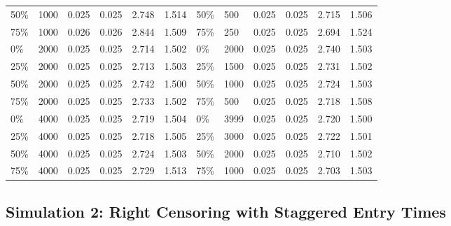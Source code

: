 \begin{table}[htbp]
\begin{tabular}{@{}C{1.8cm}lllll||C{1.8cm}lllll@{}}
		50\% & 1000   & 0.025  & 0.025 & 2.748 & 1.514 & 50\%  & 500  & 0.025 & 0.025 & 2.715 & 1.506 \\
		75\% & 1000   & 0.026  & 0.026 & 2.844 & 1.509 & 75\%  & 250  & 0.025 & 0.025 & 2.694 & 1.524 \\
		0\%  & 2000   & 0.025  & 0.025 & 2.714 & 1.502 & 0\%   & 2000 & 0.025 & 0.025 & 2.740 & 1.503 \\
		25\% & 2000   & 0.025  & 0.025 & 2.713 & 1.503 & 25\%  & 1500 & 0.025 & 0.025 & 2.731 & 1.502 \\
		50\% & 2000   & 0.025  & 0.025 & 2.742 & 1.500 & 50\%  & 1000 & 0.025 & 0.025 & 2.724 & 1.503 \\
		75\% & 2000   & 0.025  & 0.025 & 2.733 & 1.502 & 75\%  & 500  & 0.025 & 0.025 & 2.718 & 1.508 \\
		0\%  & 4000   & 0.025  & 0.025 & 2.719 & 1.504 & 0\%   & 3999 & 0.025 & 0.025 & 2.720 & 1.500 \\
		25\% & 4000   & 0.025  & 0.025 & 2.718 & 1.505 & 25\%  & 3000 & 0.025 & 0.025 & 2.722 & 1.501 \\
		50\% & 4000   & 0.025  & 0.025 & 2.724 & 1.503 & 50\%  & 2000 & 0.025 & 0.025 & 2.710 & 1.502 \\
		75\% & 4000  & 0.025 & 0.025  & 2.729 & 1.513 & 75\%  & 1000  & 0.025  & 0.025 & 2.703 & 1.503 \\ \bottomrule
	\end{tabular}
	\label{tab:rightcensor}%
\end{table}



\subsection{Simulation 2: Right Censoring with Staggered Entry Times} \label{rightcensor:sim2}

